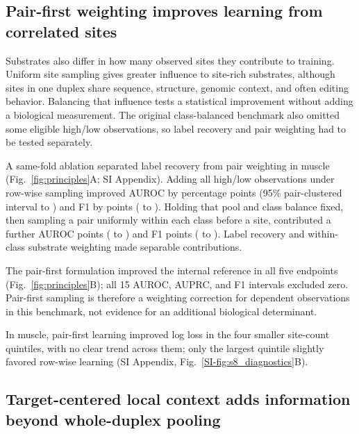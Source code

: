 \documentclass[9pt,twocolumn,twoside]{pnas-new}
\newcommand{\SIref}[1]{\ref*{SI-#1}}
\begin{document}
\subsection*{Pair-first weighting improves learning from correlated sites}

Substrates also differ in how many observed sites they contribute to training. Uniform site sampling gives greater influence to site-rich substrates, although sites in one duplex share sequence, structure, genomic context, and often editing behavior. Balancing that influence tests a statistical improvement without adding a biological measurement. The original class-balanced benchmark also omitted some eligible high/low observations, so label recovery and pair weighting had to be tested separately.

A same-fold ablation separated label recovery from pair weighting in muscle (Fig.~\ref{fig:principles}A; SI Appendix). Adding all high/low observations under row-wise sampling improved AUROC by \MuscleLabelExpansionAUROCMedian{} percentage points (95\% pair-clustered interval \MuscleLabelExpansionAUROCLower{} to \MuscleLabelExpansionAUROCUpper{}) and F1 by \MuscleLabelExpansionFOneMedian{} points (\MuscleLabelExpansionFOneLower{} to \MuscleLabelExpansionFOneUpper{}). Holding that pool and class balance fixed, then sampling a pair uniformly within each class before a site, contributed a further \MusclePairFirstIncrementAUROCMedian{} AUROC points (\MusclePairFirstIncrementAUROCLower{} to \MusclePairFirstIncrementAUROCUpper{}) and \MusclePairFirstIncrementFOneMedian{} F1 points (\MusclePairFirstIncrementFOneLower{} to \MusclePairFirstIncrementFOneUpper{}). Label recovery and within-class substrate weighting made separable contributions.

The pair-first formulation improved the internal reference in all five endpoints (Fig.~\ref{fig:principles}B); all 15 AUROC, AUPRC, and F1 intervals excluded zero. Pair-first sampling is therefore a weighting correction for dependent observations in this benchmark, not evidence for an additional biological determinant.

In muscle, pair-first learning improved log loss in the four smaller site-count quintiles, with no clear trend across them; only the largest quintile slightly favored row-wise learning (SI Appendix, Fig.~\SIref{fig:s8_diagnostics}B).

\subsection*{Target-centered local context adds information beyond whole-duplex pooling}
\end{document}
